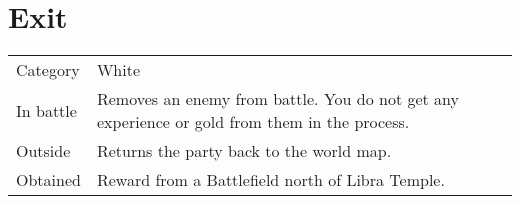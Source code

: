 \section{Exit}
\label{spell:exit}


\noindent\begin{tabularx}{\textwidth}[l]{lX}
	Category
	& White
\\ %
	In battle
	& Removes an enemy from battle. You do not get any experience or gold from them in the process.
\\ %
	Outside
	& Returns the party back to the world map.
\\ %
	Obtained
	& Reward from a Battlefield north of Libra Temple.
\end{tabularx}
